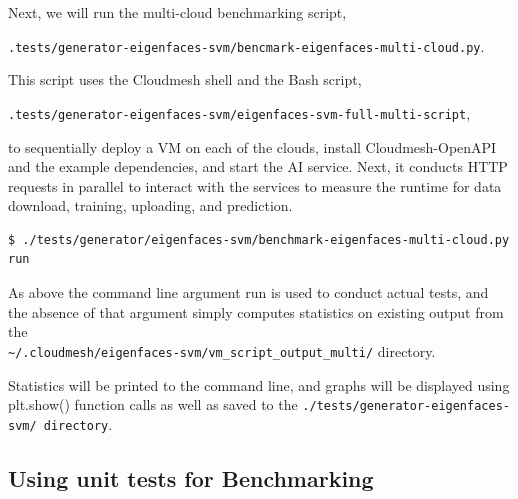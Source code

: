 Next, we will run the multi-cloud benchmarking script,

\verb|.tests/generator-eigenfaces-svm/bencmark-eigenfaces-multi-cloud.py|.

This script uses the Cloudmesh shell and the Bash script,

\verb|.tests/generator-eigenfaces-svm/eigenfaces-svm-full-multi-script|,

to sequentially deploy a VM on each of the clouds, install
Cloudmesh-OpenAPI and the example dependencies, and start the AI
service. Next, it conducts HTTP requests in parallel to interact with
the services to measure the runtime for data download, training,
uploading, and prediction.

\begin{verbatim}
$ ./tests/generator/eigenfaces-svm/benchmark-eigenfaces-multi-cloud.py run
\end{verbatim}

As above the command line argument run is used to conduct actual tests,
and the absence of that argument simply computes statistics on existing
output from the \\
\verb|~/.cloudmesh/eigenfaces-svm/vm_script_output_multi/|
directory.

Statistics will be printed to the command line, and graphs will be
displayed using plt.show() function calls as well as saved to the
\verb|./tests/generator-eigenfaces-svm/ directory|.

\subsection{Using unit tests for
Benchmarking}\label{a.4.-using-unit-tests-for-benchmarking}


